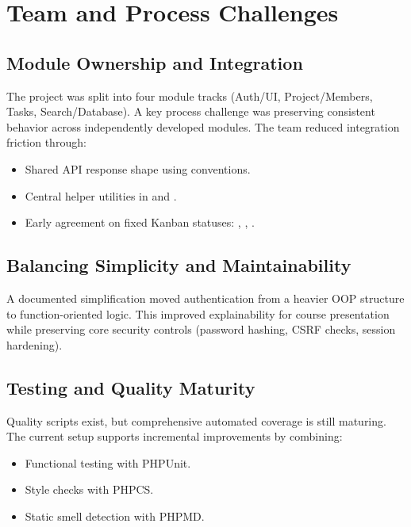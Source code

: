 \section{Team and Process Challenges}

\subsection{Module Ownership and Integration}

The project was split into four module tracks (Auth/UI, Project/Members, Tasks, Search/Database).
A key process challenge was preserving consistent behavior across independently developed modules.
The team reduced integration friction through:
\begin{itemize}
    \item Shared API response shape using  conventions.
    \item Central helper utilities in  and .
    \item Early agreement on fixed Kanban statuses: , , .
\end{itemize}

\subsection{Balancing Simplicity and Maintainability}

A documented simplification moved authentication from a heavier OOP structure to function-oriented logic.
This improved explainability for course presentation while preserving core security controls
(password hashing, CSRF checks, session hardening).

\subsection{Testing and Quality Maturity}

Quality scripts exist, but comprehensive automated coverage is still maturing.
The current setup supports incremental improvements by combining:
\begin{itemize}
    \item Functional testing with PHPUnit.
    \item Style checks with PHPCS.
    \item Static smell detection with PHPMD.
\end{itemize}
